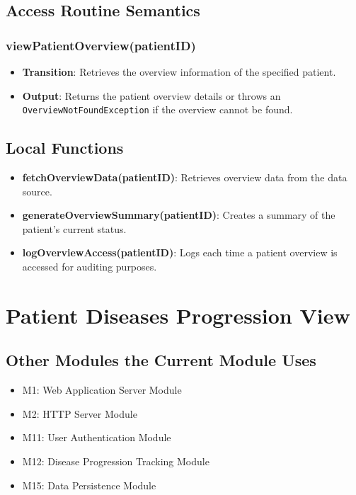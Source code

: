 \documentclass[12pt, titlepage]{article}
\begin{document}
\subsection{Access Routine Semantics}
\subsubsection{viewPatientOverview(patientID)}
\begin{itemize}
    \item \textbf{Transition}: Retrieves the overview information of the specified patient.
    \item \textbf{Output}: Returns the patient overview details or throws an \texttt{OverviewNotFoundException} if the overview cannot be found.
\end{itemize}

\subsection{Local Functions}
\begin{itemize}
\item \textbf{fetchOverviewData(patientID)}: Retrieves overview data from the data source.
\item \textbf{generateOverviewSummary(patientID)}: Creates a summary of the patient's current status.
\item \textbf{logOverviewAccess(patientID)}: Logs each time a patient overview is accessed for auditing purposes.
\end{itemize}
\section{Patient Diseases Progression View}

\subsection{Other Modules the Current Module Uses}
\begin{itemize}
\item M1: Web Application Server Module
\item M2: HTTP Server Module
\item M11: User Authentication Module
\item M12: Disease Progression Tracking Module
\item M15: Data Persistence Module
\end{itemize}
\end{document}
